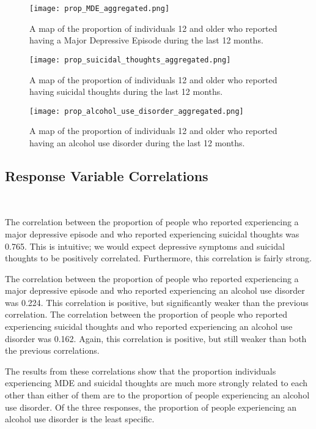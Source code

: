 \documentclass{article}
\begin{document}
\begin{figure}[!htb]
    \centering
    \texttt{[image: prop\_MDE\_aggregated.png]}
    \caption{A map of the proportion of individuals 12 and older who
	reported having a Major Depressive Episode during the last 12 months.}
    \label{fig:map-MDE}
\end{figure}

\begin{figure}[!htb]
    \centering
    \texttt{[image: prop\_suicidal\_thoughts\_aggregated.png]}
    \caption{A map of the proportion of individuals 12 and older who
	reported having suicidal thoughts during the last 12 months.}
    \label{fig:map-suicidal-thoughts}
\end{figure}

\begin{figure}[!htb]
    \centering
    \texttt{[image: prop\_alcohol\_use\_disorder\_aggregated.png]}
    \caption{A map of the proportion of individuals 12 and older who
	reported having an alcohol use disorder during the last 12 months.}
    \label{fig:map-alcohol-use}
\end{figure}

\subsection{Response Variable Correlations}~\label{sec:results-corr}

The correlation between the proportion of people who reported experiencing
a major depressive episode and
who reported experiencing suicidal thoughts was
0.765.
This is intuitive; we would expect depressive symptoms and suicidal thoughts
to be positively correlated.
Furthermore, this correlation is fairly strong.

The correlation between the proportion of people who reported experiencing
a major depressive episode and
who reported experiencing an alcohol use disorder was
0.224.
This correlation is positive, but significantly weaker than
the previous correlation.
The correlation between the proportion of people who reported experiencing
suicidal thoughts and
who reported experiencing an alcohol use disorder was
0.162.
Again, this correlation is positive, but still weaker than
both the previous correlations.

The results from these correlations show that the proportion individuals
experiencing MDE and suicidal thoughts are much more strongly related to each
other than either of them are to the proportion of people experiencing
an alcohol use disorder.
Of the three responses, the proportion of people experiencing an
alcohol use disorder is the least specific.
\end{document}
